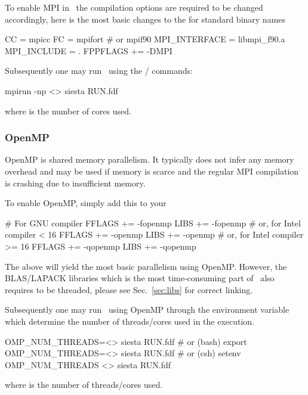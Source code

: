 To enable MPI in \siesta\ the compilation options are required to be
changed accordingly, here is the most basic changes to the
 for standard binary names
\begin{shellexample}
  CC = mpicc
  FC = mpifort # or mpif90
  MPI_INTERFACE = libmpi_f90.a
  MPI_INCLUDE = .
  FPPFLAGS += -DMPI
\end{shellexample}


Subsequently one may run \siesta\ using the
/ commands:
\begin{shellexample}
  mpirun -np <> siesta RUN.fdf
\end{shellexample}
where \shell{<>} is the number of cores used.


\subsubsection{OpenMP}

OpenMP is shared memory parallelism. It typically does not infer any
memory overhead and may be used if memory is scarce and the regular
MPI compilation is crashing due to insufficient memory.

To enable OpenMP, simply add this to your 
\begin{shellexample}
  # For GNU compiler
  FFLAGS += -fopenmp
  LIBS += -fopenmp
  # or, for Intel compiler < 16
  FFLAGS += -openmp
  LIBS += -openmp
  # or, for Intel compiler >= 16
  FFLAGS += -qopenmp
  LIBS += -qopenmp
\end{shellexample}
The above will yield the most basic parallelism using OpenMP. However,
the BLAS/LAPACK libraries which is the most time-consuming part of
\siesta\ also requires to be threaded, please see Sec.~\ref{sec:libs}
for correct linking.

Subsequently one may run \siesta\ using OpenMP through the environment
variable  which determine the number of
threads/cores used in the execution.
\begin{shellexample}
  OMP_NUM_THREADS=<> siesta RUN.fdf
  # or (bash)
  export OMP_NUM_THREADS=<>
  siesta RUN.fdf
  # or (csh)
  setenv OMP_NUM_THREADS <>
  siesta RUN.fdf
\end{shellexample}
where \shell{<>} is the number of threads/cores used.

